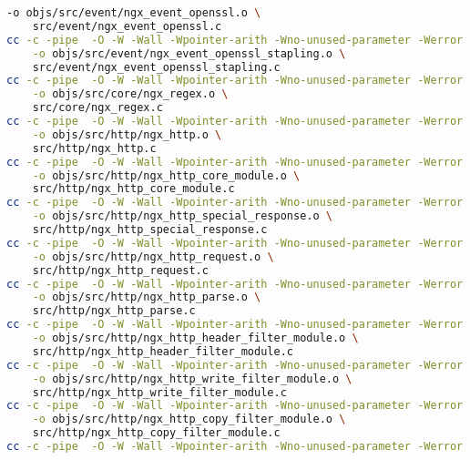 \begin{lstlisting}[language=bash]
	-o objs/src/event/ngx_event_openssl.o \
	src/event/ngx_event_openssl.c
cc -c -pipe  -O -W -Wall -Wpointer-arith -Wno-unused-parameter -Werror -g  -I src/core -I src/event -I src/event/modules -I src/os/unix -I objs \
	-o objs/src/event/ngx_event_openssl_stapling.o \
	src/event/ngx_event_openssl_stapling.c
cc -c -pipe  -O -W -Wall -Wpointer-arith -Wno-unused-parameter -Werror -g  -I src/core -I src/event -I src/event/modules -I src/os/unix -I objs \
	-o objs/src/core/ngx_regex.o \
	src/core/ngx_regex.c
cc -c -pipe  -O -W -Wall -Wpointer-arith -Wno-unused-parameter -Werror -g  -I src/core -I src/event -I src/event/modules -I src/os/unix -I objs -I src/http -I src/http/modules \
	-o objs/src/http/ngx_http.o \
	src/http/ngx_http.c
cc -c -pipe  -O -W -Wall -Wpointer-arith -Wno-unused-parameter -Werror -g  -I src/core -I src/event -I src/event/modules -I src/os/unix -I objs -I src/http -I src/http/modules \
	-o objs/src/http/ngx_http_core_module.o \
	src/http/ngx_http_core_module.c
cc -c -pipe  -O -W -Wall -Wpointer-arith -Wno-unused-parameter -Werror -g  -I src/core -I src/event -I src/event/modules -I src/os/unix -I objs -I src/http -I src/http/modules \
	-o objs/src/http/ngx_http_special_response.o \
	src/http/ngx_http_special_response.c
cc -c -pipe  -O -W -Wall -Wpointer-arith -Wno-unused-parameter -Werror -g  -I src/core -I src/event -I src/event/modules -I src/os/unix -I objs -I src/http -I src/http/modules \
	-o objs/src/http/ngx_http_request.o \
	src/http/ngx_http_request.c
cc -c -pipe  -O -W -Wall -Wpointer-arith -Wno-unused-parameter -Werror -g  -I src/core -I src/event -I src/event/modules -I src/os/unix -I objs -I src/http -I src/http/modules \
	-o objs/src/http/ngx_http_parse.o \
	src/http/ngx_http_parse.c
cc -c -pipe  -O -W -Wall -Wpointer-arith -Wno-unused-parameter -Werror -g  -I src/core -I src/event -I src/event/modules -I src/os/unix -I objs -I src/http -I src/http/modules \
	-o objs/src/http/ngx_http_header_filter_module.o \
	src/http/ngx_http_header_filter_module.c
cc -c -pipe  -O -W -Wall -Wpointer-arith -Wno-unused-parameter -Werror -g  -I src/core -I src/event -I src/event/modules -I src/os/unix -I objs -I src/http -I src/http/modules \
	-o objs/src/http/ngx_http_write_filter_module.o \
	src/http/ngx_http_write_filter_module.c
cc -c -pipe  -O -W -Wall -Wpointer-arith -Wno-unused-parameter -Werror -g  -I src/core -I src/event -I src/event/modules -I src/os/unix -I objs -I src/http -I src/http/modules \
	-o objs/src/http/ngx_http_copy_filter_module.o \
	src/http/ngx_http_copy_filter_module.c
cc -c -pipe  -O -W -Wall -Wpointer-arith -Wno-unused-parameter -Werror -g  -I src/core -I src/event -I src/event/modules -I src/os/unix -I objs -I src/http -I src/http/modules \

\end{lstlisting}
